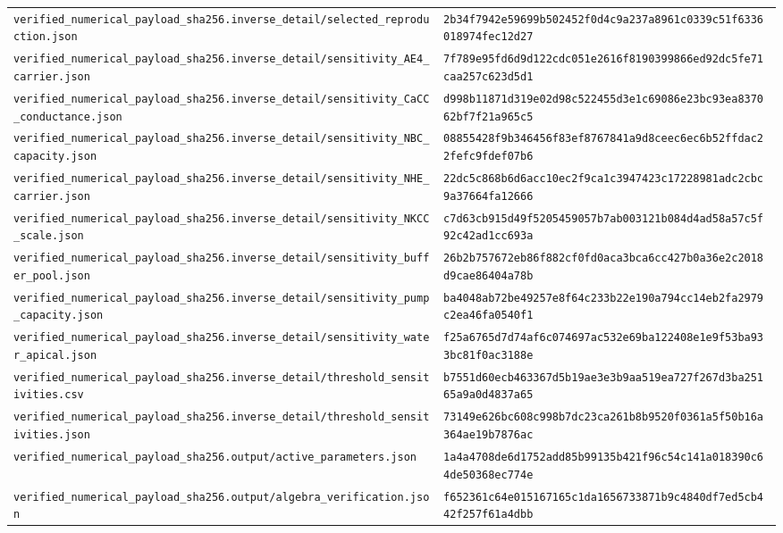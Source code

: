\begin{longtable}{p{.46\linewidth}p{.46\linewidth}}
\nolinkurl{verified_numerical_payload_sha256.inverse_detail/selected_reproduction.json} & \nolinkurl{2b34f7942e59699b502452f0d4c9a237a8961c0339c51f6336018974fec12d27} \\
\nolinkurl{verified_numerical_payload_sha256.inverse_detail/sensitivity_AE4_carrier.json} & \nolinkurl{7f789e95fd6d9d122cdc051e2616f8190399866ed92dc5fe71caa257c623d5d1} \\
\nolinkurl{verified_numerical_payload_sha256.inverse_detail/sensitivity_CaCC_conductance.json} & \nolinkurl{d998b11871d319e02d98c522455d3e1c69086e23bc93ea837062bf7f21a965c5} \\
\nolinkurl{verified_numerical_payload_sha256.inverse_detail/sensitivity_NBC_capacity.json} & \nolinkurl{08855428f9b346456f83ef8767841a9d8ceec6ec6b52ffdac22fefc9fdef07b6} \\
\nolinkurl{verified_numerical_payload_sha256.inverse_detail/sensitivity_NHE_carrier.json} & \nolinkurl{22dc5c868b6d6acc10ec2f9ca1c3947423c17228981adc2cbc9a37664fa12666} \\
\nolinkurl{verified_numerical_payload_sha256.inverse_detail/sensitivity_NKCC_scale.json} & \nolinkurl{c7d63cb915d49f5205459057b7ab003121b084d4ad58a57c5f92c42ad1cc693a} \\
\nolinkurl{verified_numerical_payload_sha256.inverse_detail/sensitivity_buffer_pool.json} & \nolinkurl{26b2b757672eb86f882cf0fd0aca3bca6cc427b0a36e2c2018d9cae86404a78b} \\
\nolinkurl{verified_numerical_payload_sha256.inverse_detail/sensitivity_pump_capacity.json} & \nolinkurl{ba4048ab72be49257e8f64c233b22e190a794cc14eb2fa2979c2ea46fa0540f1} \\
\nolinkurl{verified_numerical_payload_sha256.inverse_detail/sensitivity_water_apical.json} & \nolinkurl{f25a6765d7d74af6c074697ac532e69ba122408e1e9f53ba933bc81f0ac3188e} \\
\nolinkurl{verified_numerical_payload_sha256.inverse_detail/threshold_sensitivities.csv} & \nolinkurl{b7551d60ecb463367d5b19ae3e3b9aa519ea727f267d3ba25165a9a0d4837a65} \\
\nolinkurl{verified_numerical_payload_sha256.inverse_detail/threshold_sensitivities.json} & \nolinkurl{73149e626bc608c998b7dc23ca261b8b9520f0361a5f50b16a364ae19b7876ac} \\
\nolinkurl{verified_numerical_payload_sha256.output/active_parameters.json} & \nolinkurl{1a4a4708de6d1752add85b99135b421f96c54c141a018390c64de50368ec774e} \\
\nolinkurl{verified_numerical_payload_sha256.output/algebra_verification.json} & \nolinkurl{f652361c64e015167165c1da1656733871b9c4840df7ed5cb442f257f61a4dbb} \\

\end{longtable}

